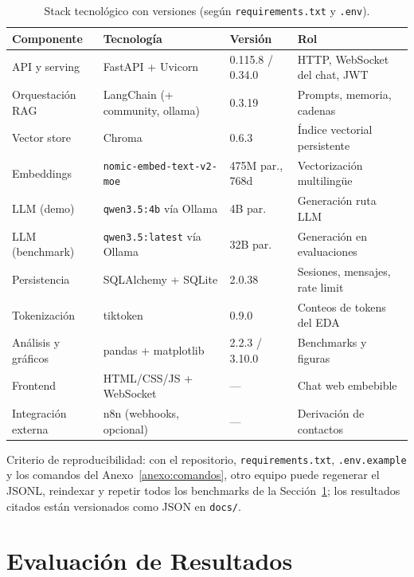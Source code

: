 \documentclass[11pt,a4paper]{article}
\newcommand{\code}[1]{\texttt{#1}}
\begin{document}
\begin{table}[H]
\centering
\small
\begin{tabular}{llll}
\toprule
\textbf{Componente} & \textbf{Tecnología} & \textbf{Versión} & \textbf{Rol} \\
\midrule
API y serving & FastAPI + Uvicorn & 0.115.8 / 0.34.0 & HTTP, WebSocket del chat, JWT \\
Orquestación RAG & LangChain (+ community, ollama) & 0.3.19 & Prompts, memoria, cadenas \\
Vector store & Chroma & 0.6.3 & Índice vectorial persistente \\
Embeddings & \code{nomic-embed-text-v2-moe} & 475M par., 768d & Vectorización multilingüe \\
LLM (demo) & \code{qwen3.5:4b} vía Ollama & 4B par. & Generación ruta LLM \\
LLM (benchmark) & \code{qwen3.5:latest} vía Ollama & 32B par. & Generación en evaluaciones \\
Persistencia & SQLAlchemy + SQLite & 2.0.38 & Sesiones, mensajes, rate limit \\
Tokenización & tiktoken & 0.9.0 & Conteos de tokens del EDA \\
Análisis y gráficos & pandas + matplotlib & 2.2.3 / 3.10.0 & Benchmarks y figuras \\
Frontend & HTML/CSS/JS + WebSocket & --- & Chat web embebible \\
Integración externa & n8n (webhooks, opcional) & --- & Derivación de contactos \\
\bottomrule
\end{tabular}
\caption{Stack tecnológico con versiones (según \code{requirements.txt} y \code{.env}).}
\label{tab:stack}
\end{table}

Criterio de reproducibilidad: con el repositorio, \code{requirements.txt},
\code{.env.example} y los comandos del Anexo~\ref{anexo:comandos}, otro
equipo puede regenerar el JSONL, reindexar y repetir todos los benchmarks de
la Sección~\ref{sec:evaluacion}; los resultados citados están versionados
como JSON en \code{docs/}.

\section{Evaluación de Resultados}\label{sec:evaluacion}
\end{document}
